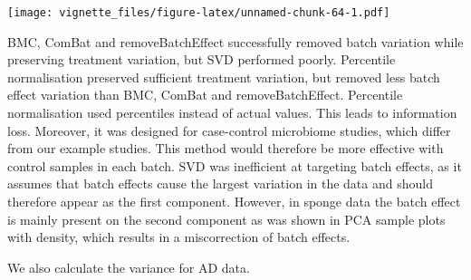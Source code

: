 \documentclass[]{book}
\begin{document}
\texttt{[image: vignette\_files/figure-latex/unnamed-chunk-64-1.pdf]}

BMC, ComBat and removeBatchEffect successfully removed batch variation
while preserving treatment variation, but SVD performed poorly.
Percentile normalisation preserved sufficient treatment variation, but
removed less batch effect variation than BMC, ComBat and
removeBatchEffect. Percentile normalisation used percentiles instead of
actual values. This leads to information loss. Moreover, it was designed
for case-control microbiome studies, which differ from our example
studies. This method would therefore be more effective with control
samples in each batch. SVD was inefficient at targeting batch effects,
as it assumes that batch effects cause the largest variation in the data
and should therefore appear as the first component. However, in sponge
data the batch effect is mainly present on the second component as was
shown in PCA sample plots with density, which results in a miscorrection
of batch effects.

We also calculate the variance for AD data.
\end{document}
